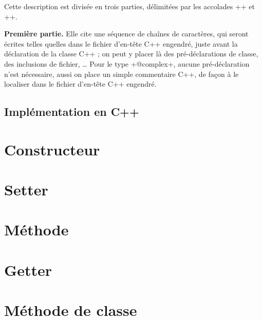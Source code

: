 Cette description est divisée en trois parties, délimitées par les accolades \ggs+{+ et \ggs+}+.

\textbf{Première partie.} Elle cite une séquence de chaînes de caractères, qui seront écrites telles quelles dans le fichier d'en-tête C++ engendré, juste avant la déclaration de la classe C++ ; on peut y placer là des pré-déclarations de classe, des inclusions de fichier, … Pour le type \ggs+@complex+, aucune pré-déclaration n'est nécessaire, aussi on place un simple commentaire C++, de façon à le localiser dans le fichier d'en-tête C++ engendré.

\subsection{Implémentation en C++}






\section{Constructeur}


\section{Setter}


\section{Méthode}


\section{Getter}


\section{Méthode de classe}

